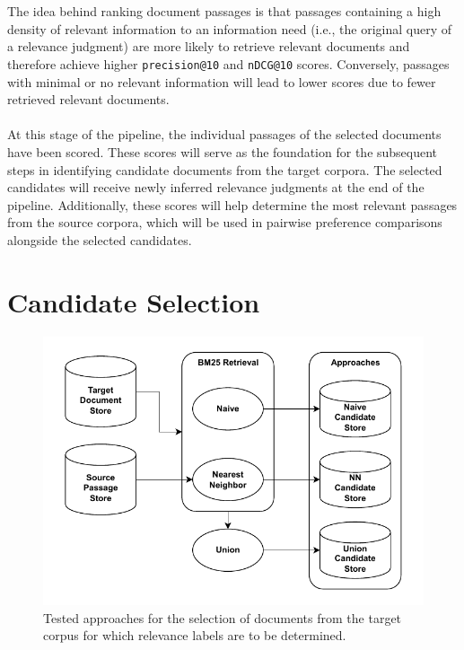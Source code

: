 \\\\
The idea behind ranking document passages is that passages containing a high density of relevant information to an information need (i.e., the original query of a relevance judgment) are more likely to retrieve relevant documents and therefore achieve higher \texttt{precision@10} and \texttt{nDCG@10} scores. Conversely, passages with minimal or no relevant information will lead to lower scores due to fewer retrieved relevant documents.
\\\\
At this stage of the pipeline, the individual passages of the selected documents have been scored. These scores will serve as the foundation for the subsequent steps in identifying candidate documents from the target corpora. The selected candidates will receive newly inferred relevance judgments at the end of the pipeline. Additionally, these scores will help determine the most relevant passages from the source corpora, which will be used in pairwise preference comparisons alongside the selected candidates.


\section{Candidate Selection}\label{candidate-selection}

\begin{figure}[t]
    \centering
    \includegraphics[width=\textwidth]{./graphics/drawio/candidate_selection.pdf}
    \caption{Tested approaches for the selection of documents from the target corpus for which relevance labels are to be determined.}
\end{figure}

